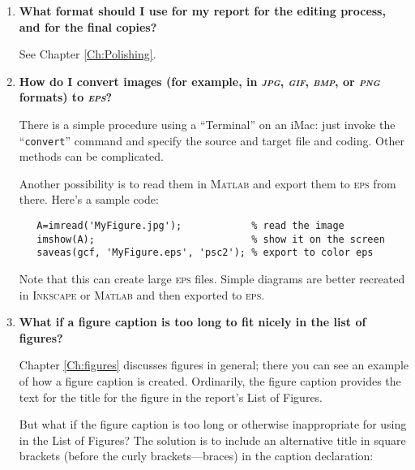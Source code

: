 \begin{enumerate}
\hspace{15pt} Rectos are always odd-numbered.
Very likely, you will not get these results if you submit your single-sided report for double-sided copying on a printer.
There are some {\LaTeX} acrobatics you must specify to make your double-sided report turn out with proper recto-verso pagination, the code for which is built into  \texttt{z-Report-Master-2014.tex};
you will see which document class to use---and which to comment out---at the top of the file.

\item {\bf What format should I use for my report for the editing process, and for the final copies?}

See Chapter \ref{Ch:Polishing}.

\item {\bf How do I convert images (for example, in {\it \textsc{jpg}}, {\it \textsc{gif}}, {\it \textsc{bmp}}, or {\it \textsc{png}}   formats) to {\it \textsc{eps}}? }

There is a simple procedure using a ``Terminal'' on an iMac: just invoke the ``\texttt{convert}'' command and specify the source and target file and coding.
Other methods can be complicated.

\hspace{15pt}Another possibility is to read them in \textsc{Matlab} and export them to \textsc{eps} from there.
Here's a sample code:

\begin{verbatim}
   A=imread('MyFigure.jpg');            % read the image
   imshow(A);                           % show it on the screen
   saveas(gcf, 'MyFigure.eps', 'psc2'); % export to color eps
\end{verbatim}

Note that this can create large \textsc{eps} files.
Simple diagrams are better recreated in \textsc{Inkscape} or \textsc{Matlab} and then exported to \textsc{eps}.

\item {\bf What if a figure caption is too long to fit nicely in the list of figures?}

Chapter \ref{Ch:figures} discusses figures in general;
there you can see an example of how a figure caption is created.
Ordinarily, the figure caption provides the text for the title for the figure in the report's List of Figures.

\hspace{15pt}But what if the figure caption is too long or otherwise inappropriate for using in the List of Figures?
The solution is to include an alternative title in square brackets (before the curly brackets---braces) in the caption declaration:


\end{enumerate}

